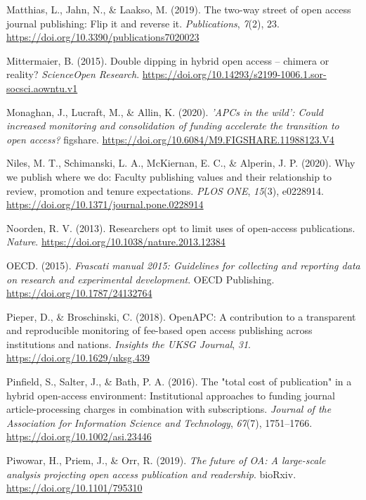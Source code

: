 \documentclass[a4paper,man,floatsintext,longtable,noextraspace,12pt]{apa6}
\newenvironment{CSLReferences}%
  {}%
  {\par}
\begin{document}
\begin{CSLReferences}{1}{0}
\leavevmode\hypertarget{ref-Matthias_2019}{}%
Matthias, L., Jahn, N., \& Laakso, M. (2019). The two-way street of open
access journal publishing: Flip it and reverse it. \emph{Publications},
\emph{7}(2), 23. \url{https://doi.org/10.3390/publications7020023}

\leavevmode\hypertarget{ref-Mittermaier_2015}{}%
Mittermaier, B. (2015). Double dipping in hybrid open access -- chimera
or reality? \emph{{ScienceOpen} Research}.
\url{https://doi.org/10.14293/s2199-1006.1.sor-socsci.aowntu.v1}

\leavevmode\hypertarget{ref-Monaghan_2020}{}%
Monaghan, J., Lucraft, M., \& Allin, K. (2020). \emph{'APCs in the
wild': Could increased monitoring and consolidation of funding
accelerate the transition to open access?} figshare.
\url{https://doi.org/10.6084/M9.FIGSHARE.11988123.V4}

\leavevmode\hypertarget{ref-Niles_2020}{}%
Niles, M. T., Schimanski, L. A., McKiernan, E. C., \& Alperin, J. P.
(2020). Why we publish where we do: Faculty publishing values and their
relationship to review, promotion and tenure expectations. \emph{{PLOS}
{ONE}}, \emph{15}(3), e0228914.
\url{https://doi.org/10.1371/journal.pone.0228914}

\leavevmode\hypertarget{ref-Van_Noorden_2013}{}%
Noorden, R. V. (2013). Researchers opt to limit uses of open-access
publications. \emph{Nature}.
\url{https://doi.org/10.1038/nature.2013.12384}

\leavevmode\hypertarget{ref-Frascati}{}%
OECD. (2015). \emph{Frascati manual 2015: Guidelines for collecting and
reporting data on research and experimental development}. {OECD
Publishing}. \url{https://doi.org/10.1787/24132764}

\leavevmode\hypertarget{ref-Pieper_2018}{}%
Pieper, D., \& Broschinski, C. (2018). {OpenAPC}: A contribution to a
transparent and reproducible monitoring of fee-based open access
publishing across institutions and nations. \emph{Insights the {UKSG}
Journal}, \emph{31}. \url{https://doi.org/10.1629/uksg.439}

\leavevmode\hypertarget{ref-Pinfield_2016}{}%
Pinfield, S., Salter, J., \& Bath, P. A. (2016). The "total cost of
publication" in a hybrid open-access environment: Institutional
approaches to funding journal article-processing charges in combination
with subscriptions. \emph{Journal of the Association for Information
Science and Technology}, \emph{67}(7), 1751--1766.
\url{https://doi.org/10.1002/asi.23446}

\leavevmode\hypertarget{ref-Piwowar_2019}{}%
Piwowar, H., Priem, J., \& Orr, R. (2019). \emph{The future of {OA}: A
large-scale analysis projecting open access publication and readership}.
{bioRxiv}. \url{https://doi.org/10.1101/795310}


\end{CSLReferences}
\end{document}
